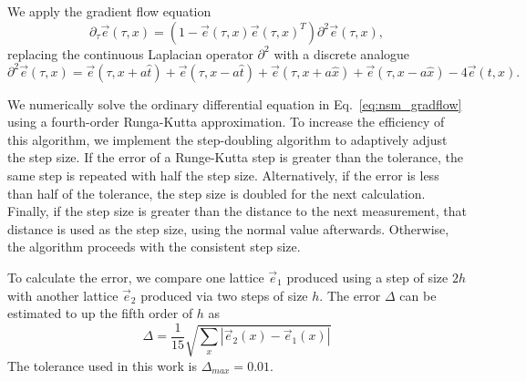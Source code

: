 \documentclass[a4paper,11pt]{article}
\newcommand{\e}{\vec e}
\begin{document}
We apply the gradient flow equation
\begin{equation}
    \partial_\tau \e (\tau, x) = \left( 1 - \e(\tau,x) \e(\tau,x)^T\right) \partial^2 \e(\tau,x),
\end{equation}
replacing the continuous Laplacian operator $\partial^2$ with a discrete analogue
\begin{equation*}
    \partial^2 \e(\tau,x) = \e(\tau, x+a \hat{t}) + \e(\tau,x-a\hat t) + \e(\tau, x+a \hat{x}) + \e(\tau,x-a\hat x) - 4 \e(t,x).
\end{equation*}

We numerically solve the ordinary differential equation in Eq.~\ref{eq:nsm_gradflow} using a fourth-order Runga-Kutta approximation. To increase the efficiency of this algorithm, we implement the step-doubling algorithm to adaptively adjust the step size. If the error of a Runge-Kutta step is greater than the tolerance, the same step is repeated with half the step size. Alternatively, if the error is less than half of the tolerance, the step size is doubled for the next calculation. Finally, if the step size is greater than the distance to the next measurement, that distance is used as the step size, using the normal value afterwards. Otherwise, the algorithm proceeds with the consistent step size.

To calculate the error, we compare one lattice $\e_1$ produced using a step of size $2h$ with another lattice $\e_2$ produced via two steps of size $h$. The error $\Delta$ can be estimated to up the fifth order of $h$ as \cite{vetterling1992}
\begin{equation}
\Delta = \frac{1}{15}\sqrt{\sum_x \left| \e_2(x) - \e_1(x) \right|}
\end{equation}
The tolerance used in this work is $\Delta_{max}=0.01$.
\end{document}
